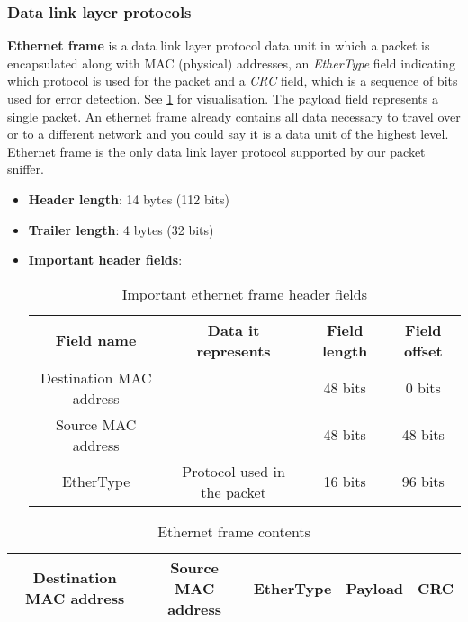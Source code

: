 \documentclass[a4paper]{article}
\begin{document}
  \subsubsection{Data link layer protocols}

  \textbf{Ethernet frame} is a data link layer protocol data unit in 
  which a packet is encapsulated along with MAC (physical) addresses, 
  an \textit{EtherType} field indicating which protocol is used for the packet
  and a \textit{CRC} field, which is a sequence of bits used for error 
  detection. 
  See \ref{ethernet_frame} for visualisation. The payload field represents a 
  single packet. 
  An ethernet frame already contains all data necessary to travel over or to a 
  different network and you could say it is a data unit of the highest level.
  Ethernet frame is the only data link layer protocol supported by our packet 
  sniffer. 

  \begin{itemize}
    \item \textbf{Header length}: 14 bytes (112 bits)
    \item \textbf{Trailer length}: 4 bytes (32 bits)
    \item \textbf{Important header fields}:
      \begin{table}[h]
        \centering
        \begin{tabular}{|c|c|c|c|}
          \hline
          Field name & Data it represents & Field length & Field offset \\
          \hline
          \hline
          Destination MAC address & & 48 bits & 0 bits \\
          \hline
          Source MAC address & & 48 bits & 48 bits \\
          \hline
          EtherType & Protocol used in the packet & 16 bits & 96 bits \\
          \hline
        \end{tabular}
        \caption{Important ethernet frame header fields}
      \end{table}
  \end{itemize}

  \begin{table}[h]
    \centering
    \begin{tabular}{|c|c|c|c|c|}
      \hline
      Destination MAC address & Source MAC address & EtherType & 
        \textbf{Payload} & CRC \\
      \hline
    \end{tabular}
    \caption{Ethernet frame contents}
    \label{ethernet_frame}
  \end{table}
\end{document}
